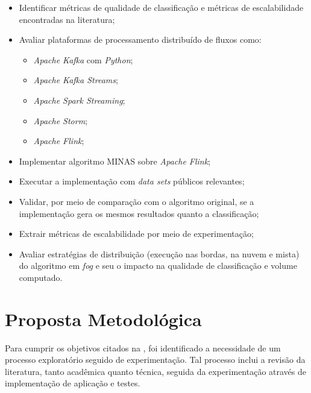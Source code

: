 \begin{itemize}
    \item Identificar métricas de qualidade de classificação e métricas de
    escalabilidade encontradas na literatura;
    \item Avaliar plataformas de processamento distribuído de fluxos como:
    \begin{itemize}
        \item \emph{Apache Kafka} com \emph{Python};
        \item \emph{Apache Kafka Streams};
        \item \emph{Apache Spark Streaming};
        \item \emph{Apache Storm};
        \item \emph{Apache Flink};
    \end{itemize}
    \item Implementar algoritmo MINAS sobre \emph{Apache Flink};
    \item Executar a implementação com \emph{data sets} públicos relevantes;
    \item Validar, por meio de comparação com o algoritmo original, se a
    implementação gera os mesmos resultados quanto a classificação;
    \item Extrair métricas de escalabilidade por meio de experimentação;
    \item Avaliar estratégias de distribuição 
    (execução nas bordas, na nuvem e mista) do algoritmo em \emph{fog} 
    e seu o impacto na qualidade de classificação e volume computado.
\end{itemize}


\section{Proposta Metodológica}


Para cumprir os objetivos citados na , foi identificado a necessidade
de um processo exploratório seguido de experimentação. Tal processo inclui a
revisão da literatura, tanto acadêmica quanto técnica, seguida da experimentação
através de implementação de aplicação e testes.

